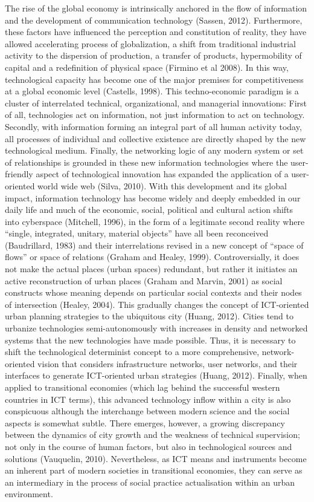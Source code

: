 \documentclass[11pt]{report}
\begin{document}
The rise of the global economy is intrinsically anchored in the flow of information and the development of communication technology (Sassen, 2012). Furthermore, these factors have influenced the perception and constitution of reality, they have allowed accelerating process of globalization, a shift from traditional industrial activity to the dispersion of production, a transfer of products, hypermobility of capital and a redefinition of physical space (Firmino et al 2008). In this way, technological capacity has become one of the major premises for competitiveness at a global economic level  (Castells, 1998).
This techno-economic paradigm is a cluster of interrelated technical, organizational, and managerial innovations: First of all, technologies act on information, not just information to act on technology. Secondly, with information forming an integral part of all human activity today, all processes of individual and collective existence are directly shaped by the new technological medium. Finally, the networking logic of any modern system or set of relationships is grounded in these new information technologies where the user-friendly aspect of technological innovation has expanded the application of a user-oriented world wide web (Silva, 2010).
With this development and its global impact, information technology has become widely and deeply embedded in our daily life and much of the economic, social, political and cultural action shifts into cyberspace (Mitchell, 1996), in the form of a legitimate second reality where “single, integrated, unitary, material objects” have all been reconceived (Baudrillard, 1983)  and their interrelations revised in a new concept of “space of flows” or space of relations (Graham and Healey, 1999). Controversially, it does not make the actual places (urban spaces) redundant, but rather it initiates an active reconstruction of urban places (Graham and Marvin, 2001) as social constructs whose meaning depends on particular social contexts and their nodes of intersection (Healey, 2004).  This gradually changes the concept of ICT-oriented urban planning strategies to the ubiquitous city (Huang, 2012).
Cities tend to urbanize technologies semi-autonomously with increases in density and networked systems that the new technologies have made possible. Thus, it is necessary to shift the technological determinist concept to a more comprehensive, network-oriented vision that considers infrastructure networks, user networks, and their interfaces to generate ICT-oriented urban strategies (Huang, 2012).
Finally, when applied to transitional economies (which lag behind the successful western countries in ICT terms), this advanced technology inflow within a city is also conspicuous although the interchange between modern science and the social aspects is somewhat subtle. There emerges, however, a growing discrepancy between the dynamics of city growth and the weakness of technical supervision; not only in the course of human factors, but also in technological sources and solutions (Vauquelin, 2010). Nevertheless, as ICT means and instruments become an inherent part of modern societies in transitional economies, they can serve as an intermediary in the process of social practice actualisation within an urban environment.
\end{document}
